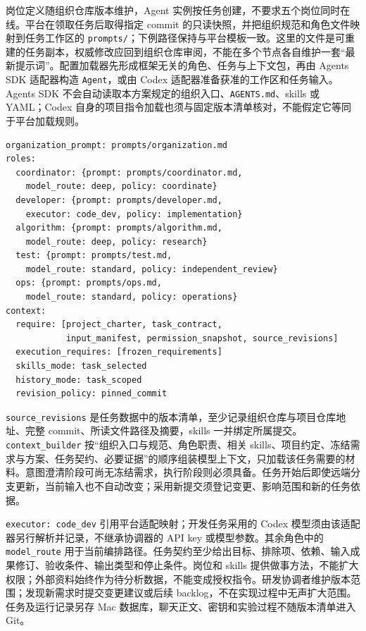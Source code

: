 \documentclass[11pt,a4paper]{article}
\begin{document}
岗位定义随组织仓库版本维护，Agent 实例按任务创建，不要求五个岗位同时在线。平台在领取任务后取得指定 commit 的只读快照，并把组织规范和角色文件映射到任务工作区的 \texttt{prompts/}；下例路径保持与平台模板一致。这里的文件是可重建的任务副本，权威修改应回到组织仓库审阅，不能在多个节点各自维护一套“最新提示词”。配置加载器先形成框架无关的角色、任务与上下文包，再由 Agents SDK 适配器构造 \texttt{Agent}，或由 Codex 适配器准备获准的工作区和任务输入。Agents SDK 不会自动读取本方案规定的组织入口、\texttt{AGENTS.md}、skills 或 YAML；Codex 自身的项目指令加载也须与固定版本清单核对，不能假定它等同于平台加载规则。

\par\noindent\begin{minipage}{\linewidth}
\begin{lstlisting}[caption={agents.yaml 的角色与上下文规则；均为平台拟建加载器字段}]
organization_prompt: prompts/organization.md
roles:
  coordinator: {prompt: prompts/coordinator.md,
    model_route: deep, policy: coordinate}
  developer: {prompt: prompts/developer.md,
    executor: code_dev, policy: implementation}
  algorithm: {prompt: prompts/algorithm.md,
    model_route: deep, policy: research}
  test: {prompt: prompts/test.md,
    model_route: standard, policy: independent_review}
  ops: {prompt: prompts/ops.md,
    model_route: standard, policy: operations}
context:
  require: [project_charter, task_contract,
            input_manifest, permission_snapshot, source_revisions]
  execution_requires: [frozen_requirements]
  skills_mode: task_selected
  history_mode: task_scoped
  revision_policy: pinned_commit
\end{lstlisting}
\end{minipage}\par


\texttt{source\_revisions} 是任务数据中的版本清单，至少记录组织仓库与项目仓库地址、完整 commit、所读文件路径及摘要，skills 一并绑定所属提交。\texttt{context\_builder} 按“组织入口与规范、角色职责、相关 skills、项目约定、冻结需求与方案、任务契约、必要证据”的顺序组装模型上下文，只加载该任务需要的材料。意图澄清阶段可尚无冻结需求，执行阶段则必须具备。任务开始后即使远端分支更新，当前输入也不自动改变；采用新提交须登记变更、影响范围和新的任务依据。

\texttt{executor: code\_dev} 引用平台适配映射；开发任务采用的 Codex 模型须由该适配器另行解析并记录，不继承协调器的 API key 或模型参数。其余角色中的 \texttt{model\_route} 用于当前编排路径。任务契约至少给出目标、排除项、依赖、输入成果修订、验收条件、输出类型和停止条件。岗位和 skills 提供做事方法，不能扩大权限；外部资料始终作为待分析数据，不能变成授权指令。研发协调者维护版本范围；发现新需求时提交变更建议或后续 backlog，不在实现过程中无声扩大范围。任务及运行记录另存 Mac 数据库，聊天正文、密钥和实验过程不随版本清单进入 Git。
\end{document}
